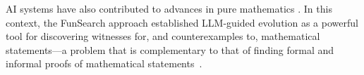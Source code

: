 AI systems have also contributed to advances in pure mathematics \citep{davies2021advancing}.
In this context, the FunSearch approach \citep{paredes2023mathematical,ellenberg2025generative} established LLM-guided evolution as a powerful tool for discovering witnesses for, and counterexamples to, mathematical statements---a problem that is complementary to that of finding formal and informal proofs of mathematical statements~\citep{trinh2024solving,hubert2024ai,yang2024formal,yang2023leandojo,thakur2024context,collins2024evaluating}.
